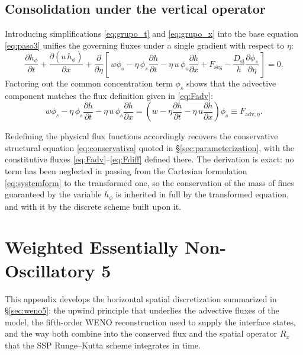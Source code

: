 \documentclass[lineno]{JFM-FLM_Au}
\begin{document}
\subsection{Consolidation under the vertical operator}
Introducing simplifications \eqref{eq:grupo_t} and \eqref{eq:grupo_x} into the base equation \eqref{eq:paso3} unifies the governing fluxes under a single gradient with respect to $\eta$:
\begin{equation}
    \frac{\partial h_{\phi}}{\partial t} + \frac{\partial (u\,h_{\phi})}{\partial x} + \frac{\partial}{\partial \eta}\left[\, w\phi_s - \eta\,\phi_s\frac{\partial h}{\partial t} - \eta\,u\,\phi_s\frac{\partial h}{\partial x} + F_{\mathrm{seg}} - \frac{D_{\mathrm{sl}}}{h}\frac{\partial \phi_s}{\partial \eta} \,\right] = 0.
    \label{eq:paso5}
\end{equation}
Factoring out the common concentration term $\phi_s$ shows that the advective component matches the flux definition given in \eqref{eq:Fadv}:
\begin{equation}
    w\phi_s - \eta\,\phi_s\frac{\partial h}{\partial t} - \eta\,u\,\phi_s\frac{\partial h}{\partial x} = \left(w - \eta\frac{\partial h}{\partial t} - \eta\,u\frac{\partial h}{\partial x}\right)\phi_s \equiv F_{\mathrm{adv},\eta}.
\end{equation}

Redefining the physical flux functions accordingly recovers the conservative structural equation \eqref{eq:conservativa} quoted in \S\ref{sec:parameterization}, with the constitutive fluxes \eqref{eq:Fadv}--\eqref{eq:Fdiff} defined there. The derivation is exact: no term has been neglected in passing from the Cartesian formulation \eqref{eq:systemform} to the transformed one, so the conservation of the mass of fines guaranteed by the variable $h_\phi$ is inherited in full by the transformed equation, and with it by the discrete scheme built upon it.

\section{Weighted Essentially Non-Oscillatory 5}
\label{app:weno5}

This appendix develops the horizontal spatial discretization summarized in \S\ref{sec:weno5}: the upwind principle that underlies the advective fluxes of the model, the fifth-order WENO reconstruction used to supply the interface states, and the way both combine into the conserved flux and the spatial operator $R_x$ that the SSP Runge--Kutta scheme integrates in time.
\end{document}
